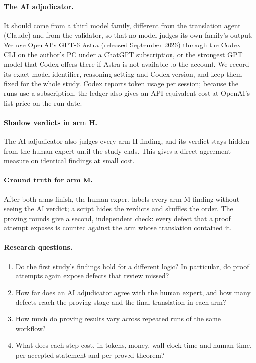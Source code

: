\documentclass[11pt,a4paper]{article}
\begin{document}
\paragraph{The AI adjudicator.} It should come from a third model family, different from the translation agent (Claude) and from the validator, so that no model judges its own family's output. We use OpenAI's GPT-6 Astra (released September 2026) through the Codex CLI on the author's PC under a ChatGPT subscription, or the strongest GPT model that Codex offers there if Astra is not available to the account. We record its exact model identifier, reasoning setting and Codex version, and keep them fixed for the whole study. Codex reports token usage per session; because the runs use a subscription, the ledger also gives an API-equivalent cost at OpenAI's list price on the run date.

\paragraph{Shadow verdicts in arm H.} The AI adjudicator also judges every arm-H finding, and its verdict stays hidden from the human expert until the study ends. This gives a direct agreement measure on identical findings at small cost.

\paragraph{Ground truth for arm M.} After both arms finish, the human expert labels every arm-M finding without seeing the AI verdict; a script hides the verdicts and shuffles the order. The proving rounds give a second, independent check: every defect that a proof attempt exposes is counted against the arm whose translation contained it.

\paragraph{Research questions.}
\begin{enumerate}[label=RQ\arabic*.]
\item Do the first study's findings hold for a different logic? In particular, do proof attempts again expose defects that review missed?
\item How far does an AI adjudicator agree with the human expert, and how many defects reach the proving stage and the final translation in each arm?
\item How much do proving results vary across repeated runs of the same workflow?
\item What does each step cost, in tokens, money, wall-clock time and human time, per accepted statement and per proved theorem?
\end{enumerate}
\end{document}
